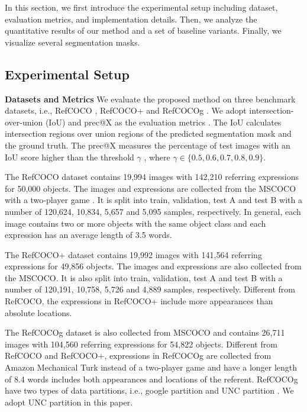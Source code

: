 In this section, we first introduce the experimental setup including dataset, evaluation metrics, and implementation details. Then, we analyze the quantitative results of our method and a set of baseline variants. Finally, we visualize several segmentation masks.

\subsection{Experimental Setup}
\textbf{Datasets and Metrics}
We evaluate the proposed method on three benchmark datasets, i.e., RefCOCO \cite{kazemzadeh2014referitgame}, RefCOCO+ \cite{kazemzadeh2014referitgame} and RefCOCOg \cite{mao2016generation}.
We adopt intersection-over-union (IoU) and prec@X as the evaluation metrics \cite{luo2020multi,ye2019cross}. The IoU calculates intersection regions over union regions of the predicted segmentation mask and the ground truth. The prec@X measures the percentage of test images with an IoU score higher than the threshold $\gamma$ , where $\gamma \in \{0.5, 0.6, 0.7, 0.8, 0.9\}$.

The RefCOCO dataset contains 19,994 images with 142,210 referring expressions for 50,000 objects. The images and expressions are collected from the MSCOCO \cite{lin2014microsoft} with a two-player game \cite{kazemzadeh2014referitgame}. It is split into train, validation, test A and test B with a number of 120,624, 10,834, 5,657 and 5,095 samples, respectively. In general, each image contains two or more objects with the same object class and each expression has an average length of 3.5 words.

The RefCOCO+ dataset contains
19,992 images with 141,564 referring expressions for 49,856 objects. The images and expressions are also collected from the MSCOCO. It is also split into train, validation, test A and test B with a number of 120,191, 10,758, 5,726 and 4,889 samples, respectively. Different from RefCOCO, the expressions in RefCOCO+ include more appearances than absolute locations.

The RefCOCOg dataset is also collected from MSCOCO and contains 26,711 images with 104,560 referring expressions for 54,822 objects. Different from RefCOCO and RefCOCO+, expressions in RefCOCOg are collected from Amazon Mechanical Turk instead of a two-player game and have a longer length of 8.4 words includes both appearances and locations of the referent.
RefCOCOg \cite{mao2016generation,nagaraja2016modeling} have two types of data partitions, i.e., google partition \cite{mao2016generation} and UNC partition \cite{nagaraja2016modeling}. We adopt UNC partition in this paper.


